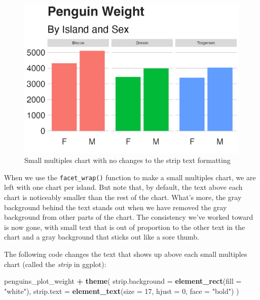\documentclass[
]{book}
\newenvironment{Shaded}{\begin{snugshade}}{\end{snugshade}}
\newcommand{\AttributeTok}[1]{\textcolor[rgb]{0.13,0.29,0.53}{#1}}
\newcommand{\DecValTok}[1]{\textcolor[rgb]{0.00,0.00,0.81}{#1}}
\newcommand{\FunctionTok}[1]{\textcolor[rgb]{0.13,0.29,0.53}{\textbf{#1}}}
\newcommand{\NormalTok}[1]{#1}
\newcommand{\SpecialCharTok}[1]{\textcolor[rgb]{0.81,0.36,0.00}{\textbf{#1}}}
\newcommand{\StringTok}[1]{\textcolor[rgb]{0.31,0.60,0.02}{#1}}
\begin{document}
\begin{figure}
\includegraphics[width=1\linewidth]{custom-theme_files/figure-latex/penguin-facetted-plot-1} \caption{Small multiples chart with no changes to the strip text formatting}\label{fig:penguin-facetted-plot}
\end{figure}

When we use the \texttt{facet\_wrap()} function to make a small multiples chart, we are left with one chart per island. But note that, by default, the text above each chart is noticeably smaller than the rest of the chart. What's more, the gray background behind the text stands out when we have removed the gray background from other parts of the chart. The consistency we've worked toward is now gone, with small text that is out of proportion to the other text in the chart and a gray background that sticks out like a sore thumb.

The following code changes the text that shows up above each small multiples chart (called the \emph{strip} in ggplot):

\begin{Shaded}
\begin{Highlighting}[]
\NormalTok{penguins\_plot\_weight }\SpecialCharTok{+}
  \FunctionTok{theme}\NormalTok{(}
    \AttributeTok{strip.background =} \FunctionTok{element\_rect}\NormalTok{(}\AttributeTok{fill =} \StringTok{"white"}\NormalTok{),}
    \AttributeTok{strip.text =} \FunctionTok{element\_text}\NormalTok{(}\AttributeTok{size =} \DecValTok{17}\NormalTok{, }\AttributeTok{hjust =} \DecValTok{0}\NormalTok{, }\AttributeTok{face =} \StringTok{"bold"}\NormalTok{)}
\NormalTok{  )}
\end{Highlighting}
\end{Shaded}
\end{document}

